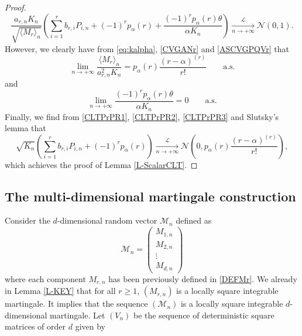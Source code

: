 \documentclass[twoside,12pt]{article}
\newcommand{\cM}{\mathcal{M}}
\newcommand{\cL}{\mathcal{L}}
\newcommand{\cN}{\mathcal{N}}
\begin{document}
\begin{proof}
\begin{equation}
\label{CLTPrPR1}
\frac{a_{r,n} K_n}{\sqrt{\langle M_{r} \rangle_n}} \left( \sum_{i=1}^{r}b_{r,i}P_{i,n} +(-1)^r p_{\alpha}(r)  +\frac{(-1)^{r} p_{\alpha}(r) \theta}{\alpha K_n}\right)\underset{n\rightarrow+\infty}{\overset{\cL}{\longrightarrow}} \cN(0, 1).
\end{equation}
However, we clearly have from \eqref{eq:kalpha}, \eqref{CVGANr} and \eqref{ASCVGPQVr} that
\begin{equation}
\label{CLTPrPR2}
\lim_{n\rightarrow+\infty}\frac{\langle M_{r}\rangle_{n}}{a^{2}_{r,n}K_{n}}=p_{\alpha}(r)\frac{(r-\alpha)^{(r)}}{r!}\qquad\text{a.s.}
\end{equation}
and
\begin{equation}
\label{CLTPrPR3}
\lim_{n\rightarrow+\infty}\frac{(-1)^{r} p_{\alpha}(r) \theta}{\alpha K_n}=0 \qquad\text{a.s.}
\end{equation}
Finally, we find from \eqref{CLTPrPR1}, \eqref{CLTPrPR2}, \eqref{CLTPrPR3} and Slutsky’s lemma that
\begin{equation}
\label{CLTPrPR4}
\sqrt{K_{n}} \left( \sum_{i=1}^{r}b_{r,i}P_{i,n} +(-1)^r p_{\alpha}(r) \right)\underset{n\rightarrow+\infty}{\overset{\cL}{\longrightarrow}} \cN\left(0, p_{\alpha}(r)\frac{(r-\alpha)^{(r)}}{r!}\right),
\end{equation}
which achieves the proof of Lemma \ref{L-ScalarCLT}.
\end{proof}


\subsection{The multi-dimensional martingale construction}
\label{Sub-MDMC}


Consider the $d$-dimensional random vector $\cM_{n}$ defined as 
\begin{equation}
\label{DEFVMr}
\cM_{n}= \begin{pmatrix}
M_{1,n} \\
M_{2,n} \\
\vdots \\
M_{d,n}
\end{pmatrix}
\end{equation}
where each component $M_{r,n}$ has been previously defined in \eqref{DEFMr}.
We already in Lemma \ref{L-KEY} that for all $r\geq 1$, $(M_{r,n})$ is a locally square integrable martingale.
It implies that the sequence $(\cM_{n})$ is a locally square integrable $d$-dimensional martingale. 
Let $(V_n)$ be the sequence of deterministic square matrices of order $d$ given by
\end{document}
